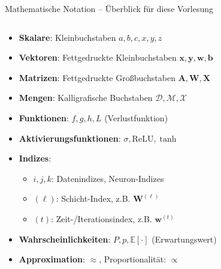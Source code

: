 \documentclass[aspectratio=1610, xcolor=dvipsnames, 9pt]{beamer}
\begin{document}
\begin{frame}{Mathematische Notation -- Überblick für diese Vorlesung}
  \begin{columns}
    \begin{column}{1\textwidth}
      \begin{itemize}
        \item \textbf{Skalare}: Kleinbuchstaben $a, b, c, x, y, z$
        \item \textbf{Vektoren}: Fettgedruckte Kleinbuchstaben $\mathbf{x}, \mathbf{y}, \mathbf{w}, \mathbf{b}$
        \item \textbf{Matrizen}: Fettgedruckte Großbuchstaben $\mathbf{A}, \mathbf{W}, \mathbf{X}$
        \item \textbf{Mengen}: Kalligrafische Buchstaben $\mathcal{D}, \mathcal{M}, \mathcal{X}$
        \item \textbf{Funktionen}: $f, g, h, L$ (Verlustfunktion)
        \item \textbf{Aktivierungsfunktionen}: $\sigma, \text{ReLU}, \tanh$
        \item \textbf{Indizes}:
        \begin{itemize}
          \item $i, j, k$: Datenindizes, Neuron-Indizes
          \item $(\ell)$: Schicht-Index, z.B. $\mathbf{W}^{(\ell)}$
          \item $(t)$: Zeit-/Iterationsindex, z.B. $\mathbf{w}^{(t)}$
        \end{itemize}
        \item \textbf{Wahrscheinlichkeiten}: $P, p, \mathbb{E}[\cdot]$ (Erwartungswert)
        \item \textbf{Approximation}: $\approx$, Proportionalität: $\propto$
      \end{itemize}
    \end{column}
  \end{columns}
\end{frame}
\end{document}
